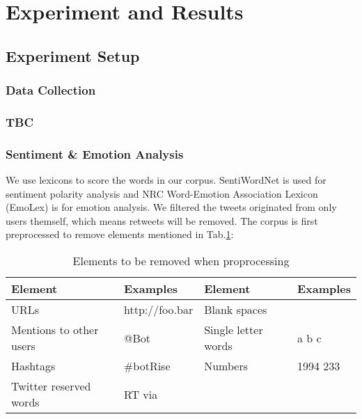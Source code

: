 \section{Experiment and Results}

\subsection{Experiment Setup}

\subsubsection{Data Collection}

\subsubsection{TBC}

\subsubsection{Sentiment \& Emotion Analysis}

We use lexicons to score the words in our corpus.
SentiWordNet is used for sentiment polarity analysis and NRC Word-Emotion Association Lexicon (EmoLex) \citep{Mohammad13} is for emotion analysis.
We filtered the tweets originated from only users themself, which means retweets will be removed.
The corpus is first preprocessed to remove elements mentioned in Tab.\ref{table:elementsRemoved}:

\begin{table}[h]
  \caption{Elements to be removed when proprocessing}
  \label{table:elementsRemoved}
  \centering
  \renewcommand{\tabularxcolumn}{m} %
  \begin{tabularx}{\textwidth}{l  l || l  l}
    \toprule
    \textbf{Element} & \textbf{Examples} & \textbf{Element}    & \textbf{Examples}
    \tabularnewline \midrule
    URLs
                     &
    http://foo.bar   & Blank spaces      &
    \tabularnewline \hline
    Mentions to other users
                     & @Bot              & Single letter words & a b c
    \tabularnewline \hline
    Hashtags
                     & \#botRise         & Numbers             & 1994 233
    \tabularnewline \hline
    Twitter reserved words
                     & RT via            &
                     &
    \tabularnewline \bottomrule
  \end{tabularx}
\end{table}

